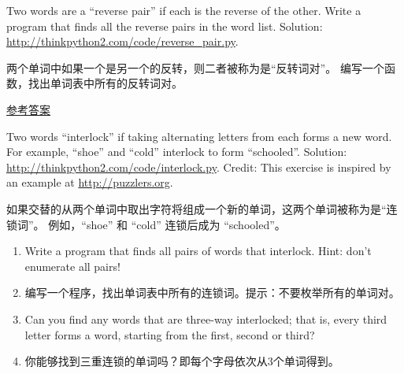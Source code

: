 \begin{exercise}

Two words are a ``reverse pair'' if each is the reverse of the
other.  Write a program that finds all the reverse pairs in the
word list.  Solution: \url{http://thinkpython2.com/code/reverse_pair.py}.

两个单词中如果一个是另一个的反转，则二者被称为是``反转词对''。
编写一个函数，找出单词表中所有的反转词对。

\href{http://thinkpython2.com/code/reverse_pair.py}{参考答案}

\end{exercise}

\begin{exercise}

Two words ``interlock'' if taking alternating letters from each forms
a new word.  For example, ``shoe'' and ``cold''
interlock to form ``schooled''.
Solution: \url{http://thinkpython2.com/code/interlock.py}.
Credit: This exercise is inspired by an example at \url{http://puzzlers.org}.

如果交替的从两个单词中取出字符将组成一个新的单词，这两个单词被称为是``连锁词''。
例如，``shoe'' 和 ``cold'' 连锁后成为 ``schooled''。

\begin{enumerate}

\item Write a program that finds all pairs of words that interlock.
  Hint: don't enumerate all pairs!

\item 编写一个程序，找出单词表中所有的连锁词。提示：不要枚举所有的单词对。

\item Can you find any words that are three-way interlocked; that is,
  every third letter forms a word, starting from the first, second or
  third?

\item 你能够找到三重连锁的单词吗？即每个字母依次从3个单词得到。

\end{enumerate}
\end{exercise}